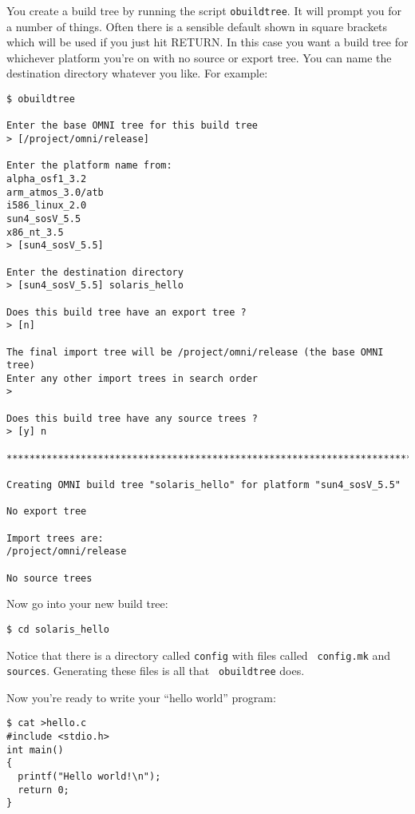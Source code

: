 \documentclass[11pt,twoside,onecolumn]{article}
\begin{document}
You create a build tree by running the script {\tt obuildtree}.  It will prompt
you for a number of things.  Often there is a sensible default shown in square
brackets which will be used if you just hit RETURN.  In this case you want a
build tree for whichever platform you're on with no source or export tree.  You
can name the destination directory whatever you like.  For example:

{\footnotesize \begin{verbatim}
$ obuildtree

Enter the base OMNI tree for this build tree
> [/project/omni/release] 

Enter the platform name from:
alpha_osf1_3.2
arm_atmos_3.0/atb
i586_linux_2.0
sun4_sosV_5.5
x86_nt_3.5
> [sun4_sosV_5.5] 

Enter the destination directory
> [sun4_sosV_5.5] solaris_hello

Does this build tree have an export tree ?
> [n] 

The final import tree will be /project/omni/release (the base OMNI tree)
Enter any other import trees in search order
> 

Does this build tree have any source trees ?
> [y] n

************************************************************************

Creating OMNI build tree "solaris_hello" for platform "sun4_sosV_5.5"

No export tree

Import trees are:
/project/omni/release

No source trees

\end{verbatim}}

Now go into your new build tree:

{\footnotesize \begin{verbatim}
$ cd solaris_hello
\end{verbatim}}

Notice that there is a directory called {\tt config} with files called {\tt
config.mk} and {\tt sources}.  Generating these files is all that {\tt
obuildtree} does.

Now you're ready to write your ``hello world'' program:

{\footnotesize \begin{verbatim}
$ cat >hello.c
#include <stdio.h>
int main()
{
  printf("Hello world!\n");
  return 0;
}
\end{verbatim}}
\end{document}
